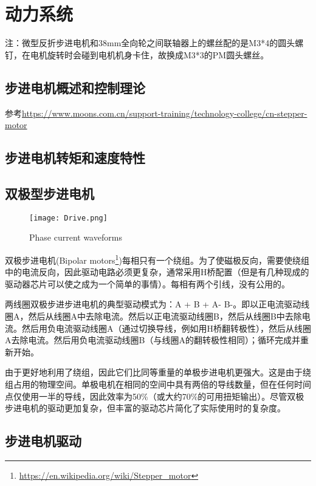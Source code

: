 \chapter{动力系统}
\label{cha:Motor}

注：微型反折步进电机和38mm全向轮之间联轴器上的螺丝配的是M3*4的圆头螺钉，在电机旋转时会碰到电机机身卡住，故换成M3*3的PM圆头螺丝。

\section{步进电机概述和控制理论}


参考\url{https://www.moons.com.cn/support-training/technology-college/cn-stepper-motor}

\section{步进电机转矩和速度特性}


\section{双极型步进电机}

\begin{figure}[htbp]
    \centering
    \texttt{[image: Drive.png]}
    \caption{Phase current waveforms}
    \label{fig:Phase-current}
\end{figure}

双极步进电机(Bipolar motors\footnote{\url{https://en.wikipedia.org/wiki/Stepper_motor}})每相只有一个绕组。为了使磁极反向，需要使绕组中的电流反向，因此驱动电路必须更复杂，通常采用H桥配置（但是有几种现成的驱动器芯片可以使之成为一个简单的事情）。每相有两个引线，没有公用的。

两线圈双极步进步进电机的典型驱动模式为：A + B + A- B-。即以正电流驱动线圈A，然后从线圈A中去除电流。然后以正电流驱动线圈B，然后从线圈B中去除电流。然后用负电流驱动线圈A（通过切换导线，例如用H桥翻转极性），然后从线圈A去除电流。然后用负电流驱动线圈B（与线圈A的翻转极性相同）；循环完成并重新开始。

由于更好地利用了绕组，因此它们比同等重量的单极步进电机更强大。这是由于绕组占用的物理空间。单极电机在相同的空间中具有两倍的导线数量，但在任何时间点仅使用一半的导线，因此效率为50\%（或大约70\%的可用扭矩输出）。尽管双极步进电机的驱动更加复杂，但丰富的驱动芯片简化了实际使用时的复杂度。

\section{步进电机驱动}

